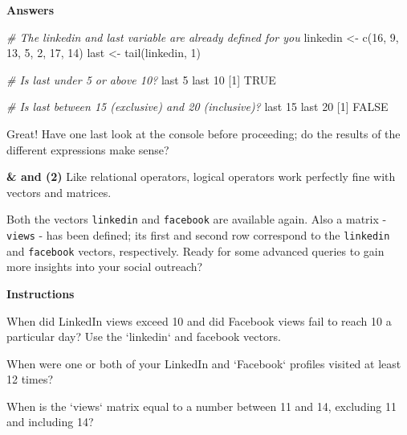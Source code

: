 \documentclass[]{article}
\newcommand{\hlnum}[1]{\textcolor[rgb]{0.816,0.125,0.439}{#1}}%
\newcommand{\hlstr}[1]{\textcolor[rgb]{0.251,0.627,0.251}{#1}}%
\newcommand{\hlcom}[1]{\textcolor[rgb]{0.502,0.502,0.502}{\textit{#1}}}%
\newcommand{\hlstd}[1]{\textcolor[rgb]{0.251,0.251,0.251}{#1}}%
\newcommand{\hlkwc}[1]{\textcolor[rgb]{0.251,0.251,0.251}{#1}}%
\newcommand{\hlkwd}[1]{\textcolor[rgb]{0.878,0.439,0.125}{#1}}%
\newenvironment{Shaded}{\begin{myshaded}}{\end{myshaded}}
\newcommand{\KeywordTok}[1]{\hlkwd{#1}}
\newcommand{\DataTypeTok}[1]{\hlkwc{#1}}
\newcommand{\DecValTok}[1]{\hlnum{#1}}
\newcommand{\StringTok}[1]{\hlstr{#1}}
\newcommand{\CommentTok}[1]{\hlcom{#1}}
\newcommand{\OtherTok}[1]{{#1}}
\newcommand{\NormalTok}[1]{\hlstd{#1}}
\begin{document}
\textbf{Answers}

\begin{Shaded}
\begin{Highlighting}[]
\CommentTok{# The linkedin and last variable are already defined for you}
\NormalTok{linkedin <-}\StringTok{ }\KeywordTok{c}\NormalTok{(}\DecValTok{16}\NormalTok{, }\DecValTok{9}\NormalTok{, }\DecValTok{13}\NormalTok{, }\DecValTok{5}\NormalTok{, }\DecValTok{2}\NormalTok{, }\DecValTok{17}\NormalTok{, }\DecValTok{14}\NormalTok{)}
\NormalTok{last <-}\StringTok{ }\KeywordTok{tail}\NormalTok{(linkedin, }\DecValTok{1}\NormalTok{)}

\CommentTok{# Is last under 5 or above 10?}
\NormalTok{last }\OperatorTok{<}\StringTok{ }\DecValTok{5} \OperatorTok{|}\StringTok{ }\NormalTok{last }\OperatorTok{>}\StringTok{ }\DecValTok{10}
\NormalTok{   [}\DecValTok{1}\NormalTok{] }\OtherTok{TRUE}

\CommentTok{# Is last between 15 (exclusive) and 20 (inclusive)?}
\NormalTok{last }\OperatorTok{>}\StringTok{ }\DecValTok{15} \OperatorTok{&}\StringTok{ }\NormalTok{last }\OperatorTok{<=}\StringTok{ }\DecValTok{20}
\NormalTok{   [}\DecValTok{1}\NormalTok{] }\OtherTok{FALSE}
\end{Highlighting}
\end{Shaded}

Great! Have one last look at the console before proceeding; do the
results of the different expressions make sense?

\textbf{\& and \textbar{} (2)} Like relational operators, logical
operators work perfectly fine with vectors and matrices.

Both the vectors \texttt{linkedin} and \texttt{facebook} are available
again. Also a matrix - \texttt{views} - has been defined; its first and
second row correspond to the \texttt{linkedin} and \texttt{facebook}
vectors, respectively. Ready for some advanced queries to gain more
insights into your social outreach?

\textbf{Instructions}

\begin{Shaded}
\begin{Highlighting}[]

\OperatorTok{*}\StringTok{ }\NormalTok{When did LinkedIn views exceed }\DecValTok{10}\NormalTok{ and did Facebook views fail to reach }\DecValTok{10} \NormalTok{ a particular day? Use the }\StringTok{`}\DataTypeTok{linkedin}\StringTok{`}\NormalTok{ and facebook vectors.}

\OperatorTok{*}\StringTok{ }\NormalTok{When were one or both of your LinkedIn and }\StringTok{`}\DataTypeTok{Facebook}\StringTok{`}\NormalTok{ profiles visited at least }\DecValTok{12}\NormalTok{ times?}

\OperatorTok{*}\StringTok{ }\NormalTok{When is the }\StringTok{`}\DataTypeTok{views}\StringTok{`}\NormalTok{ matrix equal to a number between }\DecValTok{11}\NormalTok{ and }\DecValTok{14}\NormalTok{, excluding }\DecValTok{11}\NormalTok{ and including }\DecValTok{14}\NormalTok{?}
\end{Highlighting}
\end{Shaded}
\end{document}
